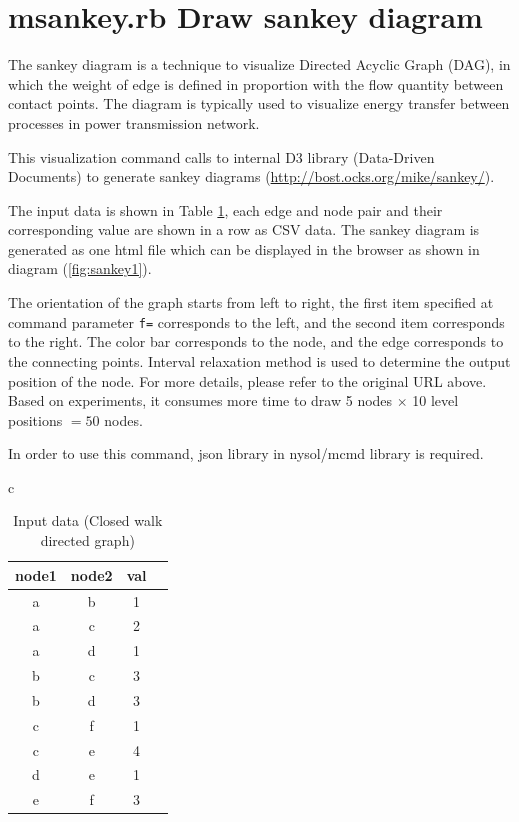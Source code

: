



\section{msankey.rb Draw sankey diagram\label{sect:msankey}}

The sankey diagram is a technique to visualize Directed Acyclic Graph (DAG), in which the weight of edge is defined in proportion with the flow quantity between contact points. The diagram is typically used to visualize energy transfer between processes in power transmission network. 

This visualization command calls to internal D3 library (Data-Driven Documents) to generate sankey diagrams (\url{http://bost.ocks.org/mike/sankey/}).   

The input data is shown in Table \ref{tbl:sankey_input1}, each edge and node pair and their corresponding value are shown in a row as CSV data. The sankey diagram is generated as one html file which can be displayed in the browser as shown in diagram (\ref{fig:sankey1}).  

The orientation of the graph starts from left to right, the first item specified at command parameter \verb|f=| corresponds to the left, and the second item corresponds to the right. 
The color bar corresponds to the node, and the edge corresponds to the connecting points.  
Interval relaxation method is used to determine the output position of the node.
For more details, please refer to the original URL above.
Based on experiments, it consumes more time to draw 5 nodes $\times$ 10 level positions $=50$ nodes. 

In order to use this command, json library in nysol/mcmd library is required.


\begin{table}[htbp]
\begin{center}
\begin{tabular}{c}

\begin{minipage}{0.12\hsize}
\begin{center}
\caption{Input data (Closed walk directed graph)\label{tbl:sankey_input1}}
{\small
\begin{tabular}{cccc}
\hline
node1&node2&val\\
\hline
a&b&1\\
a&c&2\\
a&d&1\\
b&c&3\\
b&d&3\\
c&f&1\\
c&e&4\\
d&e&1\\
e&f&3\\
\hline
\end{tabular} 
}
\end{center}
\end{minipage}

\end{tabular} 
\end{center}
\end{table} 


